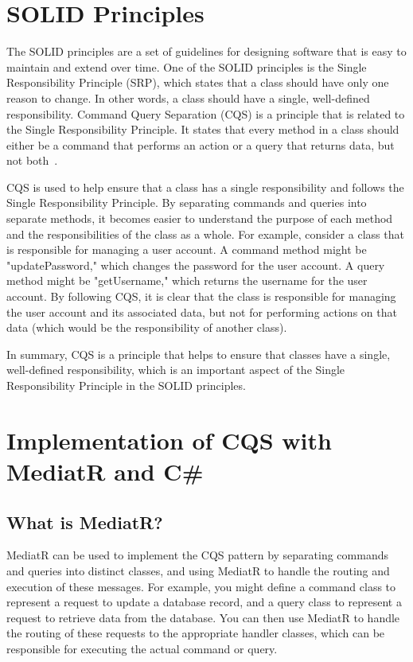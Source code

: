 \documentclass[11pt,conference]{IEEEtran}
\begin{document}
\section{SOLID Principles}

The SOLID principles are a set of guidelines for designing software that is easy to maintain and extend over time.
One of the SOLID principles is the Single Responsibility Principle (SRP), which states that a class should have only one reason to change. In other words, a class should have a single, well-defined responsibility.
Command Query Separation (CQS) is a principle that is related to the Single Responsibility Principle. It states that every method in a class should either be a command that performs an action or a query that returns data, but not both~\cite{solid-principles}.

CQS is used to help ensure that a class has a single responsibility and follows the Single Responsibility Principle. By separating commands and queries into separate methods, it becomes easier to understand the purpose of each method and the responsibilities of the class as a whole.
For example, consider a class that is responsible for managing a user account. A command method might be "updatePassword," which changes the password for the user account. A query method might be "getUsername," which returns the username for the user account. By following CQS, it is clear that the class is responsible for managing the user account and its associated data, but not for performing actions on that data (which would be the responsibility of another class).

In summary, CQS is a principle that helps to ensure that classes have a single, well-defined responsibility, which is an important aspect of the Single Responsibility Principle in the SOLID principles.

\section{Implementation of CQS with MediatR and C\#}

\subsection{What is MediatR?}

MediatR can be used to implement the CQS pattern by separating commands and queries into distinct classes, and using MediatR to handle the routing and execution of these messages. For example, you might define a command class to represent a request to update a database record, and a query class to represent a request to retrieve data from the database. You can then use MediatR to handle the routing of these requests to the appropriate handler classes, which can be responsible for executing the actual command or query.
\end{document}

